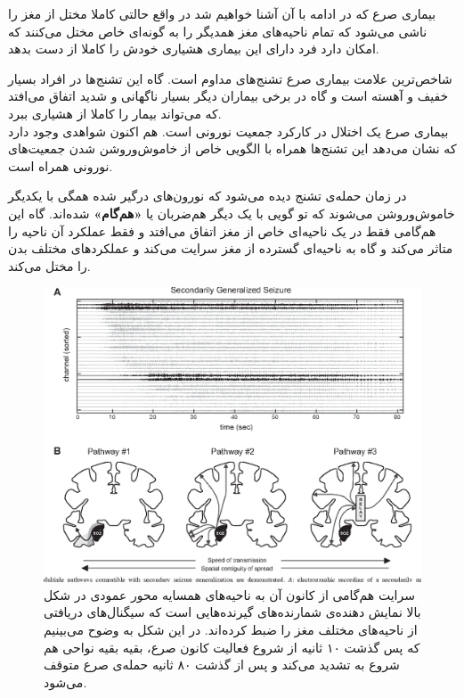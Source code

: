  بیماری صرع که در ادامه با آن آشنا خواهیم شد در واقع حالتی کاملا مختل از مغز را ناشی می‌شود که تمام ناحیه‌های مغز همدیگر را به گونه‌ای خاص مختل می‌کنند که امکان دارد فرد دارای این بیماری هشیاری خودش را کاملا از دست بدهد.

شاخص‌ترین علامت بیماری صرع تشنج‌های مداوم است. گاه این تشنج‌ها در افراد بسیار خفیف و آهسته است و گاه در برخی بیماران دیگر بسیار ناگهانی و شدید اتفاق می‌افتد که می‌تواند بیمار را کاملا از هشیاری ببرد.\\

بیماری صرع یک اختلال در کارکرد جمعیت نورونی است. هم اکنون شواهدی وجود دارد که نشان می‌دهد این تشنج‌ها همراه با الگویی خاص از خاموش‌وروشن شدن جمعیت‌های نورونی همراه است. 

در زمان حمله‌ی تشنج دیده می‌شود که نورون‌های درگیر شده همگی با یکدیگر خاموش‌وروشن می‌شوند که تو گویی با یک دیگر هم‌ضربان یا \textbf{«هم‌گام»} شده‌اند. گاه این هم‌گامی فقط در یک ناحیه‌ای خاص از مغز اتفاق می‌افتد و فقط عملکرد آن ناحیه را متاثر می‌کند و گاه به ناحیه‌ای گسترده از مغز سرایت می‌کند و عملکردهای مختلف بدن را مختل می‌کند.\\

\begin{figure}
	\centering
	\includegraphics[width=\textwidth]{../Figures/generalized_seizure.png}
	\caption{
		سرایت هم‌گامی از کانون آن به ناحیه‌های همسایه 
		\cite{Tomlinson2017SecondaryGO}
		محور عمودی در شکل بالا نمایش دهنده‌ی شمارنده‌های گیرنده‌هایی است که سیگنال‌های دریافتی از ناحیه‌های مختلف مغز را ضبط کرده‌اند. در این شکل به وضوح می‌بینیم که پس گذشت ۱۰ ثانیه از شروع فعالیت کانون صرع، بقیه بقیه نواحی هم شروع به تشدید می‌کند و پس از گذشت ۸۰ ثانیه حمله‌ی صرع متوقف می‌شود.
	}
\end{figure}

